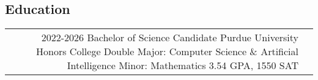 \documentclass[
	10pt, %
]{FreemanCV}
\begin{document}
\begin{paracol}{2}

	\section{Education}




	\begin{supertabular}{r l} %


		\qualificationentry
		{2022-2026} %
		{Bachelor of Science Candidate} %
		{Purdue University Honors College} %
		{Double Major: Computer Science \& Artificial Intelligence} %
		{Minor: Mathematics}
		{3.54 GPA, 1550 SAT} %




	\end{supertabular}




\end{paracol}
\end{document}
